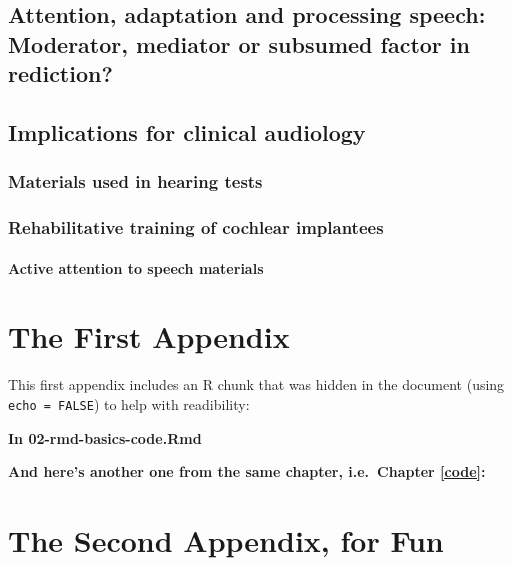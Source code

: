 \documentclass[a4paper, nobind]{templates/ociamthesis}
\newcommand*{\bibtitle}{Works Cited}
\begin{document}
\hypertarget{attention-adaptation-and-processing-speech-moderator-mediator-or-subsumed-factor-in-rediction}{%
\section{Attention, adaptation and processing speech: Moderator, mediator or subsumed factor in rediction?}\label{attention-adaptation-and-processing-speech-moderator-mediator-or-subsumed-factor-in-rediction}}

\hypertarget{implications-for-clinical-audiology}{%
\section{Implications for clinical audiology}\label{implications-for-clinical-audiology}}

\hypertarget{materials-used-in-hearing-tests}{%
\subsection{Materials used in hearing tests}\label{materials-used-in-hearing-tests}}

\hypertarget{rehabilitative-training-of-cochlear-implantees}{%
\subsection{Rehabilitative training of cochlear implantees}\label{rehabilitative-training-of-cochlear-implantees}}

\hypertarget{active-attention-to-speech-materials}{%
\subsubsection{Active attention to speech materials}\label{active-attention-to-speech-materials}}

\minitoc 

\startappendices

\hypertarget{the-first-appendix}{%
\chapter{The First Appendix}\label{the-first-appendix}}

This first appendix includes an R chunk that was hidden in the document (using \texttt{echo\ =\ FALSE}) to help with readibility:

\textbf{In 02-rmd-basics-code.Rmd}

\textbf{And here's another one from the same chapter, i.e.~Chapter \ref{code}:}

\hypertarget{the-second-appendix-for-fun}{%
\chapter{The Second Appendix, for Fun}\label{the-second-appendix-for-fun}}


\setlength{\baselineskip}{0pt} %

{\renewcommand*\MakeUppercase[1]{#1}%
\printbibliography[heading=bibintoc,title={\bibtitle}]}
\end{document}
